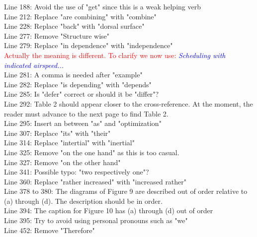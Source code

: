 \documentclass{article}
\begin{document}
Line 188: Avoid the use of "get" since this is a weak helping verb\\
Line 212: Replace "are combining" with "combine"\\
Line 228: Replace "back" with "dorsal surface"\\
Line 277: Remove "Structure wise"\\
Line 279: Replace "in dependence" with "independence"\\
\textcolor{red}{\qquad Actually the meaning is different. To clarify we now use: }\textit{\textcolor{blue}{ Scheduling with indicated airspeed...}} \\
Line 281: A comma is needed after "example"\\
Line 282: Replace "is depending" with "depends"\\
Line 285: Is "defer" correct or should it be "differ"?\\
Line 292: Table 2 should appear closer to the cross-reference.  At the moment, the reader must advance to the next page to find Table 2.\\
Line 295: Insert an between "as" and "optimization"\\
Line 307: Replace "its" with "their"\\
Line 314: Replace "intertial" with "inertial"\\
Line 325: Remove "on the one hand" as this is too casual.\\
Line 327: Remove "on the other hand"\\Line 341: Possible typo: "two respectively one"?\\
Line 360: Replace "rather increased" with "increased rather"\\
Line 378 to 380: The diagrams of Figure 9 are described out of order relative to (a) through (d).  The description should be in order.\\
Line 394: The caption for Figure 10 has (a) through (d) out of order\\
Line 395: Try to avoid using personal pronouns such as "we"\\
Line 452: Remove "Therefore" \\











\end{document}
